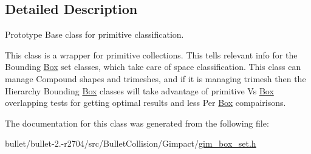 \subsection{Detailed Description}
Prototype Base class for primitive classification. 

This class is a wrapper for primitive collections. This tells relevant info for the Bounding \hyperlink{class_box}{Box} set classes, which take care of space classification. This class can manage Compound shapes and trimeshes, and if it is managing trimesh then the Hierarchy Bounding \hyperlink{class_box}{Box} classes will take advantage of primitive Vs \hyperlink{class_box}{Box} overlapping tests for getting optimal results and less Per \hyperlink{class_box}{Box} compairisons. 

The documentation for this class was generated from the following file\+:\begin{DoxyCompactItemize}
\item 
bullet/bullet-\/2.-\/r2704/src/\+Bullet\+Collision/\+Gimpact/\hyperlink{gim__box__set_8h}{gim\+\_\+box\+\_\+set.\+h}\end{DoxyCompactItemize}
